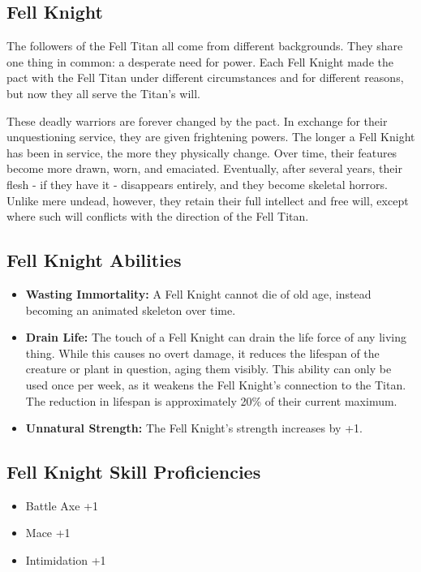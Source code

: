 \begin{multicols}{2}
\section{Fell Knight}

The followers of the Fell Titan all come from different backgrounds.
They share one thing in common: a desperate need for power. Each Fell
Knight made the pact with the Fell Titan under different circumstances
and for different reasons, but now they all serve the Titan's will.

These deadly warriors are forever changed by the pact. In exchange for
their unquestioning service, they are given frightening powers. The longer
a Fell Knight has been in service, the more they physically change. Over
time, their features become more drawn, worn, and emaciated. Eventually,
after several years, their flesh - if they have it - disappears entirely,
and they become skeletal horrors. Unlike mere undead, however, they retain
their full intellect and free will, except where such will conflicts with
the direction of the Fell Titan.

\subsection{Fell Knight Abilities}

\begin{itemize}
  \item \textbf{Wasting Immortality:} A Fell Knight cannot die of old age,
    instead becoming an animated skeleton over time.
  \item \textbf{Drain Life:} The touch of a Fell Knight can drain the life
    force of any living thing. While this causes no overt damage, it reduces
    the lifespan of the creature or plant in question, aging them visibly.
    This ability can only be used once per week, as it weakens the Fell
    Knight's connection to the Titan. The reduction in lifespan is
    approximately 20\% of their current maximum.
  \item \textbf{Unnatural Strength:} The Fell Knight's strength increases by +1.
\end{itemize}

\subsection{Fell Knight Skill Proficiencies}

\begin{itemize}
  \item Battle Axe +1
  \item Mace +1
  \item Intimidation +1
\end{itemize}


\end{multicols}
